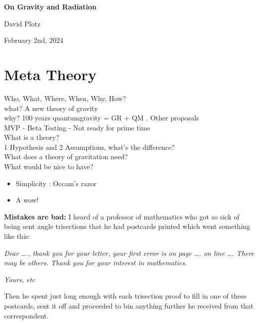 \documentclass {article}
\begin{document}
\thispagestyle{empty}%

\begin{center}\strut
	\bfseries\Huge
	On Gravity and Radiation
\end{center}


\centerline{David Plotz}


\begin{center}\strut
February 2nd, 2024
\end{center}
\vfill

	


\newpage

\section{Meta Theory}

Who, What, Where, When, Why, How?
\\[0.15in]
what?    A new theory of  gravity
\\
why?   100 years quantumgravity = GR + QM . Other proposals
\\[1in]


MVP - Beta Testing - Not ready for prime time
\\

What is a theory?
\\[1in]

1 Hypothesis and 2  Assumptions, what's the difference?
\\[1in]



What does a theory of gravitation need?
\\[2in]

What would be nice to have? 
\begin{itemize}
	\item Simplicity : Occam's razor
	\item A wow!
\end{itemize}

\vspace{10pt}


\textbf{Mistakes are bad:} I heard of a professor of mathematics who got so sick of being sent angle trisections that he had postcards printed which went something like this:

\textit{Dear …., thank you for your letter, your first error is on page …. on line …. There may be others. Thank you for your interest in mathematics.}

\textit{Yours, etc}

Then he spent just long enough with each trisection proof to fill in one of these postcards, sent it off and proceeded to bin anything further he received from that correspondent. 
\vspace{10pt}
\end{document}
